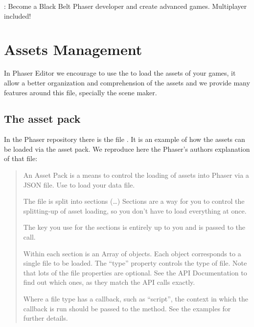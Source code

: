 \documentclass[letterpaper,10pt,english]{sphinxmanual}
\begin{document}
\noindent{}

:  Become a Black Belt Phaser developer and create advanced games. Multiplayer included!

\noindent{}


\chapter{Assets Management}
\label{\detokenize{assets_manager:assets-management}}\label{\detokenize{assets_manager::doc}}
In Phaser Editor we encourage to use the  to load the assets of your games, it allow a better organization and comprehension of the assets and we provide many features around this file, specially the scene maker.


\section{The asset pack}
\label{\detokenize{assets_manager:the-asset-pack}}
In the Phaser repository there is the file . It is an example of how the assets can be loaded via the asset pack. We reproduce here the Phaser’s authors explanation of that file:
\begin{quote}

An Asset Pack is a means to control the loading of assets into Phaser via a JSON file. Use  to load your data file.

The file is split into sections (…) Sections are a way for you to control the splitting-up of asset loading, so you don’t have to load everything at once.

The key you use for the sections is entirely up to you and is passed to the  call.

Within each section is an Array of objects. Each object corresponds to a single file to be loaded. The “type” property controls the type of file. Note that lots of the file properties are optional. See the  API Documentation to find out which ones, as they match the API calls exactly.

Where a file type has a callback, such as “script”, the context in which the callback is run should be passed to the  method. See the examples for further details.
\end{quote}
\end{document}

